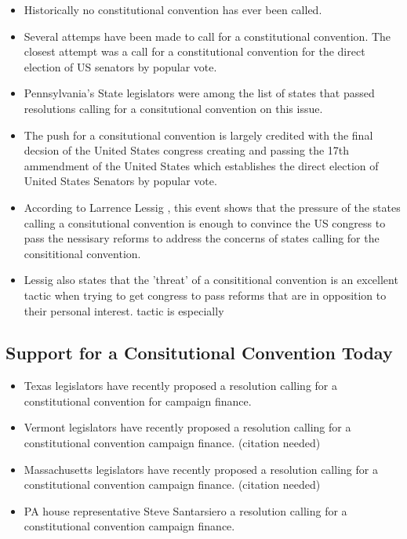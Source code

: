\documentclass[11pt]{article} %
\begin{document}
\begin{itemize}

\item Historically no constitutional convention has ever been called.

\item Several attemps have been made to call for a constitutional convention. The closest attempt was a call for a constitutional convention for the direct election of US senators by popular vote.

\item Pennsylvania's State legislators were among the list of states that passed resolutions calling for a consitutional convention on this issue.

\item The push for a consitutional convention is largely credited with the final decsion of the United States congress creating and passing the 17th ammendment of the United States which	establishes the direct election of United States Senators by popular vote.

\item According to Larrence Lessig , this event shows that the pressure of the states calling a consitutional convention is enough to convince the US congress to pass the nessisary reforms to address the concerns of states calling for the consititional convention. 

\item Lessig also states that the 'threat' of a consititional convention is an excellent tactic when trying to get congress to pass reforms that are in opposition to their personal interest.  tactic is especially 

\end{itemize}

\subsection{Support for a Consitutional Convention Today}
\begin{itemize}
\item Texas legislators have recently proposed a resolution calling for a constitutional convention for campaign finance. ~\cite{Ano}

\item Vermont  legislators have recently proposed a resolution calling for a constitutional convention campaign finance. (citation needed)

\item Massachusetts legislators have recently proposed a resolution calling for a constitutional convention campaign finance. (citation needed)

\item PA house representative Steve Santarsiero  a resolution calling for a constitutional convention campaign finance. ~\cite{Santarsiero}


\end{itemize}





{}

\end{document}
